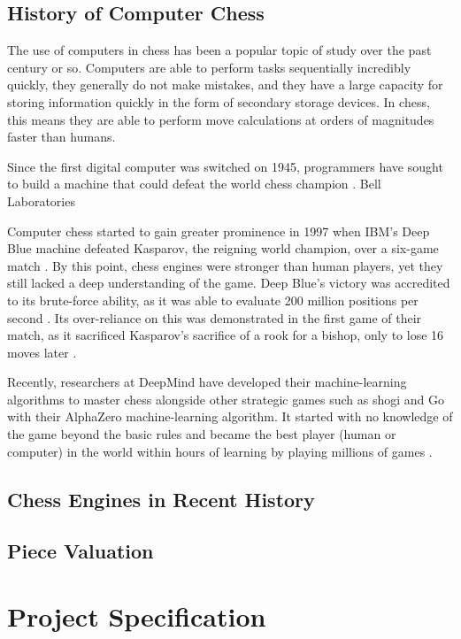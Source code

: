 \documentclass[%
 superscriptaddress,
showpacs,preprintnumbers,
 amsmath,
 amssymb,
 aps,
 pra,
showkeys,
onecolumn,
notitlepage,
11pt,
tightenlines      %
]{revtex4-1}
\begin{document}
\subsection{History of Computer Chess}

The use of computers in chess has been a popular topic of study over the past century or so. 
Computers are able to perform tasks sequentially incredibly quickly, they generally do not make mistakes, and they have a large capacity for storing information quickly in the form of secondary storage devices. In chess, this means they are able to perform move calculations at orders of magnitudes faster than humans.

Since the first digital computer was switched on 1945, programmers have sought to build a machine that could defeat the world chess champion \cite{earlyComputerChessHistory}. Bell Laboratories 

Computer chess started to gain greater prominence in 1997 when IBM's Deep Blue machine defeated Kasparov, the reigning world champion, over a six-game match \cite{seirawan1997implications}. By this point, chess engines were stronger than human players, yet they still lacked a deep understanding of the game. Deep Blue's victory was accredited to its brute-force ability, as it was able to evaluate 200 million positions per second \cite{strogatz2018one}. Its over-reliance on this was demonstrated in the first game of their match, as it sacrificed Kasparov's sacrifice of a rook for a bishop, only to lose 16 moves later \cite{strogatz2018one}.

Recently, researchers at DeepMind have developed their machine-learning algorithms to master chess alongside other strategic games such as shogi and Go with their AlphaZero machine-learning algorithm. It started with no knowledge of the game beyond the basic rules and became the best player (human or computer) in the world within hours of learning by playing millions of games \cite{strogatz2018one}. 

\subsection{Chess Engines in Recent History}
\subsection{Piece Valuation}

\section{Project Specification}
\end{document}
